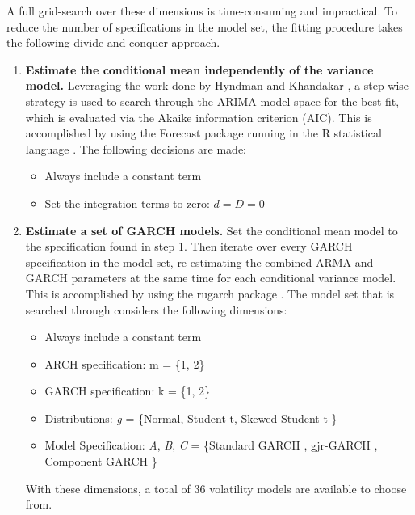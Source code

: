 A full grid-search over these dimensions is time-consuming and impractical. To reduce the number of specifications in the model set, the fitting procedure takes the following divide-and-conquer approach.

\begin{enumerate}
    \item \textbf{Estimate the conditional mean independently of the variance model.} Leveraging the work done by Hyndman and Khandakar \cite{HyndmanKhandakar2008AutoArima}, a step-wise strategy is used to search through the ARIMA model space for the best fit, which is evaluated via the Akaike information criterion (AIC). This is accomplished by using the Forecast package \cite{RForecast} running in the R statistical language \cite{RBase}. The following decisions are made: 
    
    \begin{itemize}
        \item Always include a constant term
        \item Set the integration terms to zero: $d = D = 0$
    \end{itemize}
    
    \item \textbf{Estimate a set of GARCH models.} Set the conditional mean model to the specification found in step 1. Then iterate over every GARCH specification in the model set, re-estimating the combined ARMA and GARCH parameters at the same time for each conditional variance model. This is accomplished by using the rugarch package \cite{Rugarch}. The model set that is searched through considers the following dimensions:
    
    \begin{itemize}
        \item Always include a constant term
        \item ARCH specification: m = \{1, 2\}
        \item GARCH specification: k = \{1, 2\}
        \item Distributions: \emph{g} = \{Normal, Student-t, Skewed Student-t \cite{Fernandez_Steel_1998}\}
        \item Model Specification: \emph{A}, \emph{B}, \emph{C} = \{Standard GARCH \cite{Bollerslev1986Garch}, gjr-GARCH \cite{GJR_1993}, Component GARCH \cite{EngleLee1993APA} \}
    \end{itemize}
    
    With these dimensions, a total of 36 volatility models are available to choose from.


\end{enumerate}
